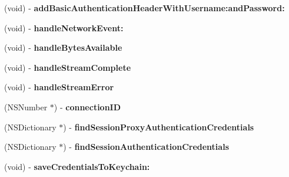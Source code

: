 \begin{DoxyCompactItemize}
\item 
\hypertarget{interface_a_s_i_h_t_t_p_request_a0295b7fbbc9af2be76f9dfe06f75f1ca}{
(void) -\/ {\bfseries addBasicAuthenticationHeaderWithUsername:andPassword:}}
\label{interface_a_s_i_h_t_t_p_request_a0295b7fbbc9af2be76f9dfe06f75f1ca}

\item 
\hypertarget{interface_a_s_i_h_t_t_p_request_a271ec6e669cafa5063866022fb3577ba}{
(void) -\/ {\bfseries handleNetworkEvent:}}
\label{interface_a_s_i_h_t_t_p_request_a271ec6e669cafa5063866022fb3577ba}

\item 
\hypertarget{interface_a_s_i_h_t_t_p_request_aefae44a699dc9e70b78930322cfb3558}{
(void) -\/ {\bfseries handleBytesAvailable}}
\label{interface_a_s_i_h_t_t_p_request_aefae44a699dc9e70b78930322cfb3558}

\item 
\hypertarget{interface_a_s_i_h_t_t_p_request_aaf27f7d11cd1194d5087db56cc553d89}{
(void) -\/ {\bfseries handleStreamComplete}}
\label{interface_a_s_i_h_t_t_p_request_aaf27f7d11cd1194d5087db56cc553d89}

\item 
\hypertarget{interface_a_s_i_h_t_t_p_request_ab792c755bbcec55490688d2b5aa729ec}{
(void) -\/ {\bfseries handleStreamError}}
\label{interface_a_s_i_h_t_t_p_request_ab792c755bbcec55490688d2b5aa729ec}

\item 
\hypertarget{interface_a_s_i_h_t_t_p_request_a3e06c0a51784d32cc8198f616e63c530}{
(NSNumber $\ast$) -\/ {\bfseries connectionID}}
\label{interface_a_s_i_h_t_t_p_request_a3e06c0a51784d32cc8198f616e63c530}

\item 
\hypertarget{interface_a_s_i_h_t_t_p_request_a480d62ba0d9ba8d1a64b25b45fb2d965}{
(NSDictionary $\ast$) -\/ {\bfseries findSessionProxyAuthenticationCredentials}}
\label{interface_a_s_i_h_t_t_p_request_a480d62ba0d9ba8d1a64b25b45fb2d965}

\item 
\hypertarget{interface_a_s_i_h_t_t_p_request_a0f38ffc0ae199e83262895f640c9c263}{
(NSDictionary $\ast$) -\/ {\bfseries findSessionAuthenticationCredentials}}
\label{interface_a_s_i_h_t_t_p_request_a0f38ffc0ae199e83262895f640c9c263}

\item 
\hypertarget{interface_a_s_i_h_t_t_p_request_a3a57684f5aba49781ec3c9c9ef1516a6}{
(void) -\/ {\bfseries saveCredentialsToKeychain:}}
\label{interface_a_s_i_h_t_t_p_request_a3a57684f5aba49781ec3c9c9ef1516a6}


\end{DoxyCompactItemize}
